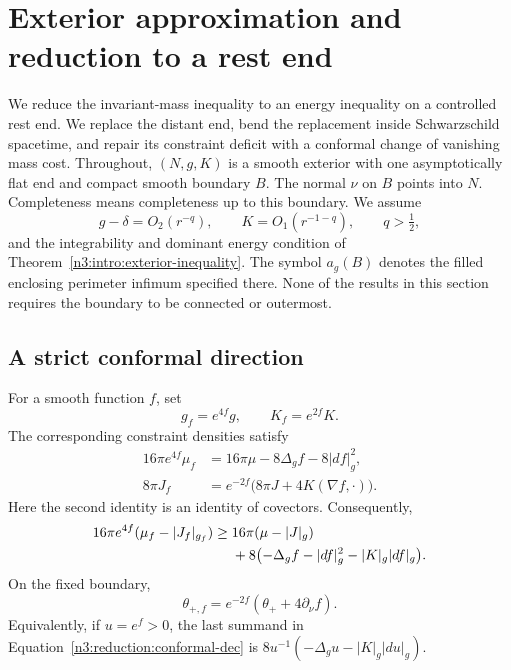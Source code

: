 \section{Exterior approximation and reduction to a rest end}
\label{n3:reduction:section}

We reduce the invariant-mass inequality to an energy inequality on a
controlled rest end.  We replace the distant end, bend the replacement
inside Schwarzschild spacetime, and repair its constraint deficit with a
conformal change of vanishing mass cost.  Throughout,
$(N,g,K)$ is a smooth exterior with one asymptotically flat end and compact
smooth boundary $B$.  The normal $\nu$ on $B$ points into $N$.  Completeness
means completeness up to this boundary.  We assume
\begin{equation}
\label{n3:reduction:original-decay}
 g-\delta=O_2(r^{-q}),\qquad K=O_1(r^{-1-q}),\qquad q>\tfrac12,
\end{equation}
and the integrability and dominant energy condition of
Theorem~\ref{n3:intro:exterior-inequality}.  The symbol $a_g(B)$ denotes the
filled enclosing perimeter infimum specified there.  None of the results
in this section requires the boundary to be connected or outermost.

\subsection{A strict conformal direction}

\begin{lemma}
\label{n3:reduction:conformal-formulas}
For a smooth function $f$, set
\[
 g_f=e^{4f}g,\qquad K_f=e^{2f}K.
\]
The corresponding constraint densities satisfy
\begin{align}
 16\pi e^{4f}\mu_f
   &=16\pi\mu-8\Delta_g f-8|df|_g^2,
       \label{n3:reduction:conformal-energy}\\
 8\pi J_f
   &=e^{-2f}\bigl(8\pi J+4K(\nabla f,\cdot)\bigr).
       \label{n3:reduction:conformal-momentum}
\end{align}
Here the second identity is an identity of covectors.  Consequently,
\begin{align}
 16\pi e^{4f}(\mu_f-|J_f|_{g_f})
 \ge{}&16\pi(\mu-|J|_g)\notag\\
 &+8\bigl(-\Delta_g f-|df|_g^2-|K|_g|df|_g\bigr).
       \label{n3:reduction:conformal-dec}
\end{align}
On the fixed boundary,
\begin{equation}
 \theta_{+,f}=e^{-2f}(\theta_++4\partial_\nu f).
       \label{n3:reduction:conformal-expansion}
\end{equation}
Equivalently, if $u=e^f>0$, the last summand in
Equation~\eqref{n3:reduction:conformal-dec} is
$8u^{-1}(-\Delta_g u-|K|_g|du|_g)$.
\end{lemma}

